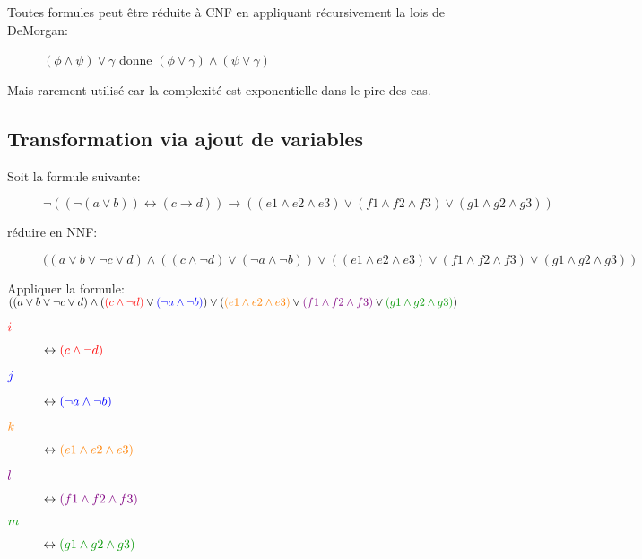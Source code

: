 Toutes formules peut être réduite à CNF en appliquant récursivement la lois de DeMorgan:
\begin{description}
\item[] $(\phi \wedge \psi) \vee \gamma$ donne $(\phi \vee \gamma) \wedge (\psi \vee \gamma)$
\end{description}

Mais rarement utilisé car la complexité est exponentielle dans le pire des cas.\\

\pagebreak
\subsection{Transformation via ajout de variables}

Soit la formule suivante:
\begin{description}
\item[] $\neg((\neg(a \vee b)) \leftrightarrow ( c\rightarrow d))\rightarrow((e1\wedge e2\wedge e3) \vee (f1 \wedge f2 \wedge f3)\vee (g1 \wedge g2 \wedge g3))$
\end{description}

réduire en NNF:

\begin{description}
\item[] $((a \vee b \vee \neg c \vee d) \wedge ((c \wedge \neg d) \vee (\neg a \wedge \neg b)) \vee ((e1 \wedge e2 \wedge e3) \vee (f1 \wedge f2 \wedge f3)\vee(g1 \wedge g2 \wedge g3))$
\end{description}

Appliquer la formule:\\
$((a \vee b \vee \neg c \vee d) \wedge (\crouge{(c \wedge \neg d)} \vee \cblue{(\neg a \wedge \neg b)}) \vee (\corange{(e1 \wedge e2 \wedge e3)} \vee \cviolet{(f1 \wedge f2 \wedge f3)}\vee \cvert{(g1 \wedge g2 \wedge g3)})$\\

\begin{description}
\item[$\textcolor{red}{i}$] $\leftrightarrow \textcolor{red}{(c \wedge \neg d)}$
\item[$\textcolor{blue}{j}$] $\leftrightarrow \textcolor{blue}{(\neg a \wedge \neg b)}$
\item[$\textcolor{orange}{k}$] $\leftrightarrow \textcolor{orange}{(e1 \wedge e2 \wedge e3)}$
\item[$\textcolor{violet}{l}$] $\leftrightarrow \textcolor{violet}{(f1 \wedge f2 \wedge f3)}$
\item[$\cvert{m}$] $\leftrightarrow \cvert{(g1 \wedge g2 \wedge g3)}$
\end{description}

